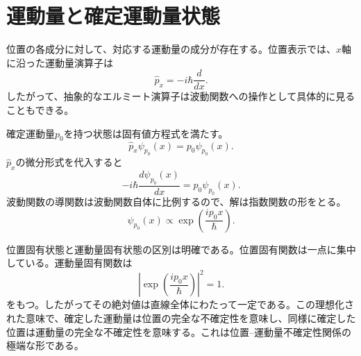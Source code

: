 \section{運動量と確定運動量状態}

位置の各成分に対して、対応する運動量の成分が存在する。位置表示では、\(x\)軸に沿った運動量演算子は
\begin{equation}
\hat p_x=-i\hbar\frac{d}{dx}.
\end{equation}
したがって、抽象的なエルミート演算子は波動関数への操作として具体的に見ることもできる。

確定運動量\(p_0\)を持つ状態は固有値方程式を満たす。
\begin{equation}
\hat p_x\psi_{p_0}(x)=p_0\psi_{p_0}(x).
\end{equation}
\(\hat p_x\)の微分形式を代入すると
\begin{equation}
-i\hbar\frac{d\psi_{p_0}(x)}{dx}
=p_0\psi_{p_0}(x).
\end{equation}
波動関数の導関数は波動関数自体に比例するので、解は指数関数の形をとる。
\begin{equation}
\psi_{p_0}(x)\propto
\exp\left(\frac{ip_0x}{\hbar}\right).
\end{equation}

\begin{classroomqa}
\end{classroomqa}

位置固有状態と運動量固有状態の区別は明確である。位置固有関数は一点に集中している。運動量固有関数は
\begin{equation}
\left|\exp\left(\frac{ip_0x}{\hbar}\right)\right|^2=1.
\end{equation}
をもつ。したがってその絶対値は直線全体にわたって一定である。この理想化された意味で、確定した運動量は位置の完全な不確定性を意味し、同様に確定した位置は運動量の完全な不確定性を意味する。これは位置--運動量不確定性関係の極端な形である。

\begin{classroomqa}
\end{classroomqa}

